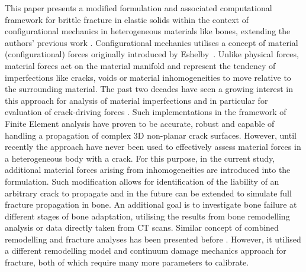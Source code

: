 \documentclass[11pt]{ACMEarticle}
\numberwithin{equation}{section}
\begin{document}
This paper presents a modified formulation and associated computational framework for brittle fracture in elastic solids within the context of configurational mechanics in heterogeneous materials like bones, extending the authors' previous work \citep{kaczmarczyk2017energy}. Configurational mechanics utilises a concept of material (configurational) forces originally introduced by Eshelby~\citep{eshelby1951force}. Unlike physical forces, material forces act on the material manifold and represent the tendency of imperfections like cracks, voids or material inhomogeneities to move relative to the surrounding material. The past two decades have seen a growing interest in this approach for analysis of material imperfections \citep{maugin2016configurational} and in particular for evaluation of crack-driving forces \citep{steinmann2001application, ozencc2016configurational, kaczmarczyk2017energy}. Such implementations in the framework of Finite Element analysis have proven to be accurate, robust and capable of handling a propagation of complex 3D non-planar crack surfaces. However, until recently the approach have never been used to effectively assess material forces in a heterogeneous body with a crack. For this purpose, in the current study, additional material forces arising from inhomogeneities are introduced into the formulation. Such modification allows for identification of the liability of an arbitrary crack to propagate and in the future can be extended to simulate full fracture propagation in bone. An additional goal is to investigate bone failure at different stages of bone adaptation, utilising the results from bone remodelling analysis or data directly taken from CT scans. Similar concept of combined remodelling and fracture analyses has been presented before \citep{hambli2013integrated}. However, it utilised a different remodelling model and continuum damage mechanics approach for fracture, both of which require many more parameters to calibrate. 
\end{document}
